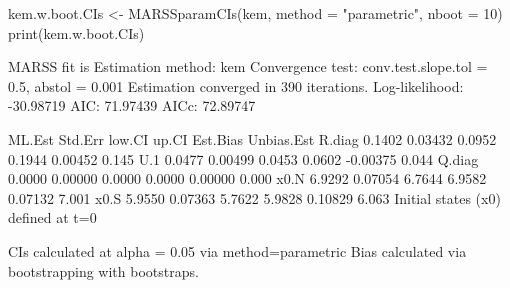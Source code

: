 \begin{Schunk}
\begin{Sinput}
 kem.w.boot.CIs <- MARSSparamCIs(kem, method = "parametric", nboot = 10)
 print(kem.w.boot.CIs)
\end{Sinput}
\begin{Soutput}
MARSS fit is
Estimation method: kem 
Convergence test: conv.test.slope.tol = 0.5, abstol = 0.001
Estimation converged in 390 iterations. 
Log-likelihood: -30.98719 
AIC: 71.97439   AICc: 72.89747   
 
       ML.Est Std.Err low.CI  up.CI Est.Bias Unbias.Est
R.diag 0.1402 0.03432 0.0952 0.1944  0.00452      0.145
U.1    0.0477 0.00499 0.0453 0.0602 -0.00375      0.044
Q.diag 0.0000 0.00000 0.0000 0.0000  0.00000      0.000
x0.N   6.9292 0.07054 6.7644 6.9582  0.07132      7.001
x0.S   5.9550 0.07363 5.7622 5.9828  0.10829      6.063
Initial states (x0) defined at t=0

CIs calculated at alpha = 0.05 via method=parametric 
Bias calculated via  bootstrapping with  bootstraps. 
\end{Soutput}
\end{Schunk}
